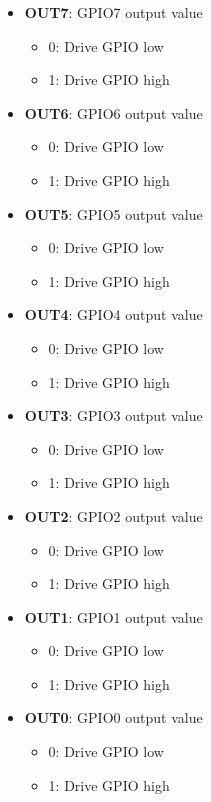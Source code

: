 \documentclass{article}
\begin{document}
		\begin{itemize}
			\item \textbf{OUT7}: GPIO7 output value
			\begin{itemize}
				\item 0: Drive GPIO low
				\item 1: Drive GPIO high
			\end{itemize}
			\item \textbf{OUT6}: GPIO6 output value
			\begin{itemize}
				\item 0: Drive GPIO low
				\item 1: Drive GPIO high
			\end{itemize}
			\item \textbf{OUT5}: GPIO5 output value
			\begin{itemize}
				\item 0: Drive GPIO low
				\item 1: Drive GPIO high
			\end{itemize}
			\item \textbf{OUT4}: GPIO4 output value
			\begin{itemize}
				\item 0: Drive GPIO low
				\item 1: Drive GPIO high
			\end{itemize}
			\item \textbf{OUT3}: GPIO3 output value
			\begin{itemize}
				\item 0: Drive GPIO low
				\item 1: Drive GPIO high
			\end{itemize}
			\item \textbf{OUT2}: GPIO2 output value
			\begin{itemize}
				\item 0: Drive GPIO low
				\item 1: Drive GPIO high
			\end{itemize}
			\item \textbf{OUT1}: GPIO1 output value
			\begin{itemize}
				\item 0: Drive GPIO low
				\item 1: Drive GPIO high
			\end{itemize}
			\item \textbf{OUT0}: GPIO0 output value
			\begin{itemize}
				\item 0: Drive GPIO low
				\item 1: Drive GPIO high
			\end{itemize}
		\end{itemize}
			
\end{document}
